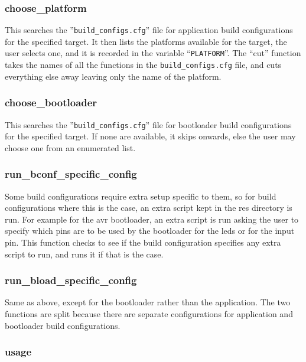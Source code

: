 \documentclass[a4paper, oneside, 11pt, titlepage, onecolumn, openright]{report}
\begin{document}
\subsubsection{choose\_platform}
			\label{sss:crecompChoosePlatform}
			This searches the ''\texttt{build\_configs.cfg}'' file for application build configurations	for the specified target. It then lists the platforms available for the target, the user selects one, and it is recorded in the variable ``\texttt{PLATFORM}''. The ``cut'' function takes the names of all the functions in the \texttt{build\_configs.cfg} file, and cuts everything else away leaving only the name of the platform.
			
\subsubsection{choose\_bootloader}
			\label{sss:crecompChooseBootloader}
			This searches the ''\texttt{build\_configs.cfg}'' file for bootloader build configurations for the specified target. If none are available, it skips onwards, else the user may choose one from an enumerated list.
			
\subsubsection{run\_bconf\_specific\_config}
			\label{sss:crecompRunBconfSpecificConfig}
			Some build configurations require extra setup specific to them, so for build configurations where this is the case, an extra script kept in the res directory is run. For example for the avr bootloader, an extra script is run asking the user to specify which pins are to be used by the bootloader for the leds or for the input pin.\newline
			This function checks to see if the build configuration specifies any extra script to run, and runs it if that is the case.
			
\subsubsection{run\_bload\_specific\_config}
			\label{sss:crecompRunBloadSpecificConfig}	
			Same as above, except for the bootloader rather than the application. The two functions are split because there are separate configurations for application and bootloader build configurations.
			
\subsubsection{usage}
			\label{sss:crecompUsage}
			
\end{document}
